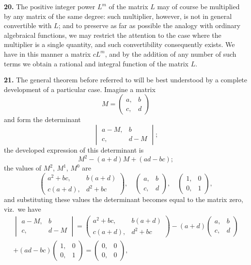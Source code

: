 \documentclass[12pt,a4paper]{article}
\theoremstyle{definition}
\begin{document}
\medskip
\noindent\textbf{20.} The positive integer power $L^m$ of the matrix $L$ may of course be multiplied by any matrix of the same degree: such multiplier, however, is not in general convertible with $L$; and to preserve as far as possible the analogy with ordinary algebraical functions, we may restrict the attention to the case where the multiplier is a single quantity, and such convertibility consequently exists. We have in this manner a matrix $cL^m$, and by the addition of any number of such terms we obtain a rational and integral function of the matrix $L$.

\medskip
\noindent\textbf{21.} The general theorem before referred to will be best understood by a complete development of a particular case. Imagine a matrix
\[
M = \begin{pmatrix} a, & b \\ c, & d \end{pmatrix}
\]
and form the determinant
\[
\begin{vmatrix} a-M, & b \\ c, & d-M \end{vmatrix};
\]
the developed expression of this determinant is
\[M^2 - (a+d)M + (ad-bc);\]
the values of $M^2$, $M^1$, $M^0$ are
\[
\begin{pmatrix} a^2+bc, & b(a+d) \\ c(a+d), & d^2+bc \end{pmatrix},\quad
\begin{pmatrix} a, & b \\ c, & d \end{pmatrix},\quad
\begin{pmatrix} 1, & 0 \\ 0, & 1 \end{pmatrix},
\]
and substituting these values the determinant becomes equal to the matrix zero, viz.\ we have
\begin{multline*}
\begin{vmatrix} a-M, & b \\ c, & d-M \end{vmatrix}
= \begin{pmatrix} a^2+bc, & b(a+d) \\ c(a+d), & d^2+bc \end{pmatrix}
- (a+d)\begin{pmatrix} a, & b \\ c, & d \end{pmatrix} \\
+ (ad-bc)\begin{pmatrix} 1, & 0 \\ 0, & 1 \end{pmatrix}
= \begin{pmatrix} 0, & 0 \\ 0, & 0 \end{pmatrix},
\end{multline*}
\end{document}
